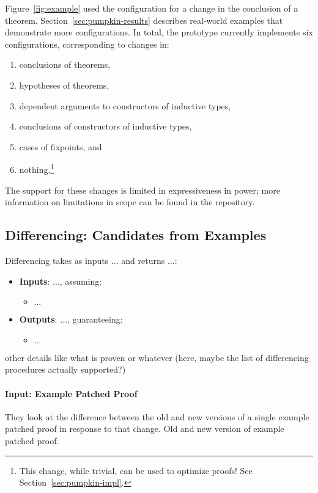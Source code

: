 Figure~\ref{fig:example} used the configuration for a change in the conclusion of a theorem.
Section~\ref{sec:pumpkin-results} describes real-world examples that demonstrate more configurations.
In total, the \sysname prototype currently implements six configurations, corresponding to changes in:

\begin{enumerate}
\item conclusions of theorems,
\item hypotheses of theorems,
\item dependent arguments to constructors of inductive types, 
\item conclusions of constructors of inductive types,
\item cases of fixpoints, and
\item nothing.\footnote{This change, while trivial, can be used to optimize proofs! See Section~\ref{sec:pumpkin-impl}.}
\end{enumerate}
The support for these changes is limited in expressiveness in power;
more information on limitations in scope can be found in the repository. %

\subsection{Differencing: Candidates from Examples}
\label{sec:pumpkin-spec-diff}

Differencing takes as inputs $\ldots$ and returns $\ldots$:

\begin{itemize}
\item \textbf{Inputs}: $\ldots$, assuming:
\begin{itemize}
\item $\ldots$
\end{itemize}
\item \textbf{Outputs}: $\ldots$, guaranteeing:
\begin{itemize}
\item $\ldots$
\end{itemize}
\end{itemize}

other details like what is proven or whatever (here, maybe the list of differencing procedures actually supported?)

\iffalse
\paragraph{Input: Example Patched Proof}
They look at the difference between the old and new versions of a single example patched proof in response to that change.
Old and new version of example patched proof.

